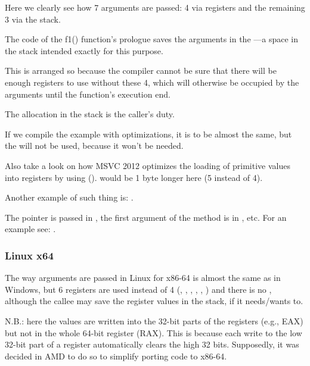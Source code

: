 
Here we clearly see how 7 arguments are passed: 4 via registers and the remaining 3 via the stack.

The code of the f1() function's prologue saves the arguments in the ---a space in the stack
intended exactly for this purpose.

This is arranged so because the compiler cannot be sure that there will be enough registers to use without these 4,
which will otherwise be occupied by the arguments until the function's execution end.

The  allocation in the stack is the caller's duty.



If we compile the example with optimizations, it is to be almost the same, 
but the  will not be used, because it won't be needed.

\label{using_MOV_and_pack_of_LEA_to_load_values}

Also take a look on how MSVC 2012 optimizes the loading of primitive values into registers by using \LEA ().
 would be 1 byte longer here (5 instead of 4).

Another example of such thing is: .


The \ITthis pointer is passed in \RCX, the first argument of the method is in \RDX, etc.
For an example see: .
 
\subsubsection{Linux x64}

The way arguments are passed in Linux for x86-64 is almost the same as in Windows, but 6 registers are
used instead of 4 (\RDI, \RSI, \RDX, \RCX, , ) and there is no , 
although the \gls{callee} may save the register values in the stack, if it needs/wants to.




N.B.: here the values are written into the 32-bit parts of the registers (e.g., EAX) but not in the whole 64-bit 
register (RAX).
This is because each write to the low 32-bit part of a register automatically clears the high 32 bits.
Supposedly, it was decided in AMD to do so to simplify porting code to x86-64.

